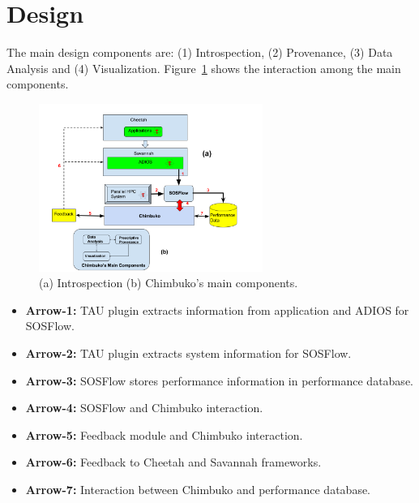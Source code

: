 \section{Design}
The main design components are: (1) Introspection, (2) Provenance, (3) Data Analysis and (4) Visualization. 
Figure~\ref{designfig:1} shows the interaction among the main components.

\begin{figure}[th!]
 \centering
  \includegraphics[width=0.65\textwidth]{Figs/Online_Chimbuko}
 \caption{(a) Introspection (b) Chimbuko's main components.}
\label{designfig:1}     
 \end{figure}

\begin{itemize}
\item {\bf{Arrow-1:}} TAU plugin extracts information from application and ADIOS for SOSFlow. 
\item {\bf{Arrow-2:}} TAU plugin extracts system information for SOSFlow.
\item {\bf{Arrow-3:}} SOSFlow stores performance information in performance database.
\item{\bf{ Arrow-4:}} SOSFlow and Chimbuko interaction.
\item {\bf{Arrow-5:}} Feedback module and Chimbuko interaction.
\item {\bf{Arrow-6:}} Feedback to Cheetah and Savannah frameworks.
\item {\bf{Arrow-7:}} Interaction between Chimbuko and performance database.
\end{itemize}

